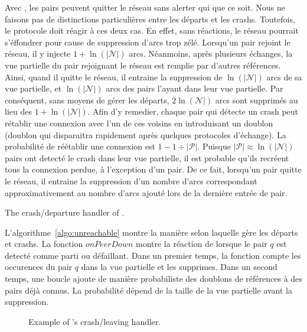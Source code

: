 Avec \SPRAY, les pairs peuvent quitter le réseau sans alerter qui que ce
soit. Nous ne faisons pas de distinctions particulières entre les départs et les
crashs. Toutefois, le protocole doit réagir à ces deux cas. En effet, sans
réactions, le réseau pourrait s'éffondrer pour cause de suppression d'arcs trop
zélé. Lorsqu'un pair rejoint le réseau, il y injecte $1+\ln(|\mathcal{N}|)$
arcs. Néanmoins, après plusieurs échanges, la vue partielle du pair rejoignant
le réseau est remplie par d'autres références. Ainsi, quand il quitte le réseau,
il entraine la suppression de $\ln(|\mathcal{N}|)$ arcs de sa vue partielle, et
$\ln(|\mathcal{N}|)$ arcs des pairs l'ayant dans leur vue partielle. Par
conséquent, sans moyens de gérer les départs, $2\ln(\mathcal{N}|)$ arcs sont
supprimés au lieu des $1+\ln(|\mathcal{N}|)$. Afin d'y remedier, chaque pair qui
détecte un crash peut rétablir une connexion avec l'un de ces voisins en
introduisant un doublon (doublon qui disparaitra rapidement après quelques
protocoles d'échange). La probabilité de réétablir une connexion est
$1-1\div{|\mathcal{P}|}$. Puisque ${|\mathcal{P}|}\approx \ln(|\mathcal{N}|)$
pairs ont detecté le crash dans leur vue partielle, il est probable qu'ils
recréent tous la connexion perdue, à l'exception d'un pair. De ce fait,
lorsqu'un pair quitte le réseau, il entraine la suppression d'un nombre d'arcs
correspondant approximativement au nombre d'arcs ajouté lors de la dernière
entrée de pair.

\begin{algorithm}[h]
  
  \caption{\label{algo:unreachable}The crash/departure handler of \SPRAY.}
\end{algorithm}

L'algorithme~\ref{algo:unreachable} montre la manière selon laquelle \SPRAY gère
les départs et crashs. La fonction $onPeerDown$ montre la réaction de \SPRAY
lorsque le pair $q$ est detecté comme parti ou défaillant. Dans un premier
temps, la fonction compte les occurences du pair $q$ dans la vue partielle et
les supprimes. Dans un second temps, une boucle ajoute de manière probabiliste
des doublons de références à des pairs déjà connus. La probabilité dépend de la
taille de la vue partielle avant la suppression.

\begin{figure*}
  \centering
  \hspace{10pt}
  \hspace{10pt}
  \caption{\label{fig:crashexample}Example of \SPRAY's crash/leaving
    handler. }
\end{figure*}

